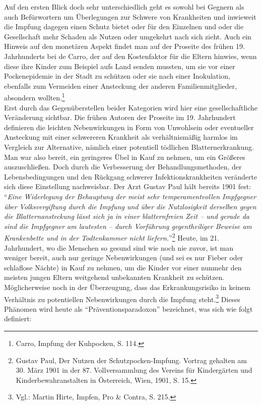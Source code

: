 \documentclass[
    a4paper,
    12pt,
    hyphens,
    chapterprefix=true,
    headheight=33pt,
    footheight=29pt,
    headings=optiontohead, %
]{scrartcl}
\begin{document}
{Auf den ersten Blick doch sehr unterschiedlich geht es sowohl bei Gegnern als auch Befürwortern um Überlegungen zur Schwere von Krankheiten und inwieweit die Impfung dagegen einen Schutz bietet oder für den Einzelnen und oder die Gesellschaft mehr Schaden als Nutzen oder umgekehrt nach sich zieht. Auch ein Hinweis auf den monetären Aspekt findet man auf der Proseite des frühen 19. Jahrhunderts bei de Carro, der auf den Kostenfaktor für die Eltern hinwies, wenn diese ihre Kinder zum Beispiel aufs Land senden mussten, um sie vor einer Pockenepidemie in der Stadt zu schützen oder sie nach einer Inokulation, ebenfalls zum Vermeiden einer Ansteckung der anderen Familienmitglieder, absondern wollten.\footnote{Carro, Impfung der Kuhpocken, S. 114.}\\
Erst durch das Gegenüberstellen beider Kategorien wird hier eine gesellschaftliche Veränderung sichtbar. Die frühen Autoren der Proseite im 19. Jahrhundert definieren die leichten Nebenwirkungen in Form von Unwohlsein oder eventueller Ansteckung mit einer schwereren Krankheit als verhältnismäßig harmlos im Vergleich zur Alternative, nämlich einer potentiell tödlichen Blatternerkrankung. Man war also bereit, ein geringeres Übel in Kauf zu nehmen, um ein Größeres auszuschließen. Doch durch die Verbesserung der Behandlungsmethoden, der Lebensbedingungen und den Rückgang schwerer Infektionskrankheiten veränderte sich diese Einstellung nachweisbar. Der Arzt Gustav Paul hält bereits 1901 fest: "`\textit{Eine Widerlegung der Behauptung der meist sehr temperamentvollen Impfgegner über Volksvergiftung durch die Impfung und über die Nutzlosigkeit derselben gegen die Blatternansteckung lässt sich ja in einer blatternfreien Zeit -- und gerade da sind die Impfgegner am lautesten -- durch Vorführung gegentheiliger Beweise am Krankenbette und in der Todtenkammer nicht liefern.}"'\footnote{Gustav Paul, Der Nutzen der Schutzpocken-Impfung. Vortrag gehalten am 30. März 1901 in der 87. Vollversammlung des Vereins für Kindergärten und Kinderbewahranstalten in Österreich, Wien, 1901, S. 15.} Heute, im 21. Jahrhundert, wo die Menschen so gesund sind wie noch nie zuvor, ist man weniger bereit, auch nur geringe Nebenwirkungen (und sei es nur Fieber oder schlaflose Nächte) in Kauf zu nehmen, um die Kinder vor einer nunmehr den meisten jungen Eltern weitgehend unbekannten Krankheit zu schützen. Möglicherweise noch in der Überzeugung, dass das Erkrankungsrisiko in keinem Verhältnis zu potentiellen Nebenwirkungen durch die Impfung steht.\footnote{Vgl.: Martin Hirte, Impfen, Pro \& Contra, S. 215.} Dieses Phänomen wird heute als "`Präventionsparadoxon"' bezeichnet, was sich wie folgt definiert:

}
\end{document}
